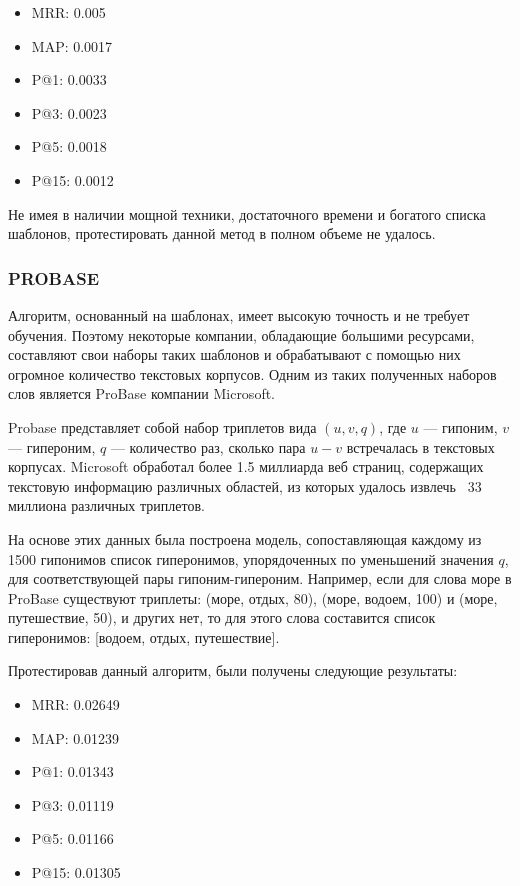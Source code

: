 \begin{itemize}
\item MRR: 0.005
\item MAP: 0.0017
\item P@1: 0.0033
\item P@3: 0.0023
\item P@5: 0.0018
\item P@15: 0.0012
\end{itemize}

Не имея в наличии мощной техники, достаточного времени и богатого списка
шаблонов, протестировать данной метод в полном объеме не удалось.

\subsubsection{PROBASE}

Алгоритм, основанный на шаблонах, имеет высокую точность и не требует обучения.
Поэтому некоторые компании, обладающие большими ресурсами, составляют свои наборы
таких шаблонов и обрабатывают с помощью них огромное количество текстовых корпусов.
Одним из таких полученных наборов слов является ProBase компании Microsoft.

Probase представляет собой набор триплетов вида $(u, v, q)$, где $u$ — гипоним, $v$ —
гипероним, $q$ — количество раз, сколько пара $u-v$ встречалась в текстовых корпусах.
Microsoft обработал более 1.5 миллиарда веб страниц, содержащих текстовую
информацию различных областей, из которых удалось извлечь ~33 миллиона различных
триплетов.

На основе этих данных была построена модель, сопоставляющая каждому из 1500 гипонимов список гиперонимов, упорядоченных по уменьшений значения $q$, для соответствующей пары гипоним-гипероним. Например, если для слова море в ProBase существуют триплеты: (море, отдых, 80), (море, водоем, 100) и (море, путешествие, 50), и
других нет, то для этого слова составится список гиперонимов: [водоем, отдых,
путешествие].

Протестировав данный алгоритм, были получены следующие результаты:


\begin{itemize}
\item MRR: 0.02649
\item MAP: 0.01239
\item P@1: 0.01343
\item P@3: 0.01119
\item P@5: 0.01166
\item P@15: 0.01305
\end{itemize}


